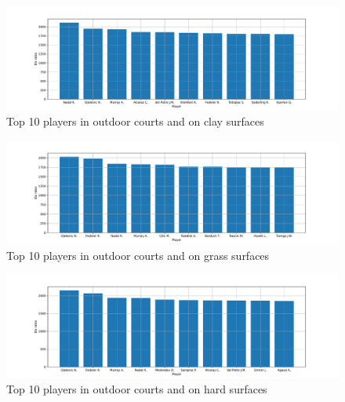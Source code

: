 \documentclass[preprint,aps,nofootinbib,a4paper,superscriptaddress,longbibliography,amsfonts,amssymb,amsmath,titlepage]{revtex4-2}
\begin{document}
%
%
\begin{figure}[h]
\includegraphics[width=\textwidth]{pictures/top-10-elo-rates-outdoor-clay.pdf}
\caption{Top 10 players in outdoor courts and on clay surfaces}
\label{top-10-elo-rates-outdoor-clay}
\end{figure}
%
%
\begin{figure}[h]
\includegraphics[width=\textwidth]{pictures/top-10-elo-rates-outdoor-grass.pdf}
\caption{Top 10 players in outdoor courts and on grass surfaces}
\label{top-10-elo-rates-outdoor-grass}
\end{figure}
%
%
\begin{figure}[h]
\includegraphics[width=\textwidth]{pictures/top-10-elo-rates-outdoor-hard.pdf}
\caption{Top 10 players in outdoor courts and on hard surfaces}
\label{top-10-elo-rates-outdoor-hard}
\end{figure}
%
\end{document}
